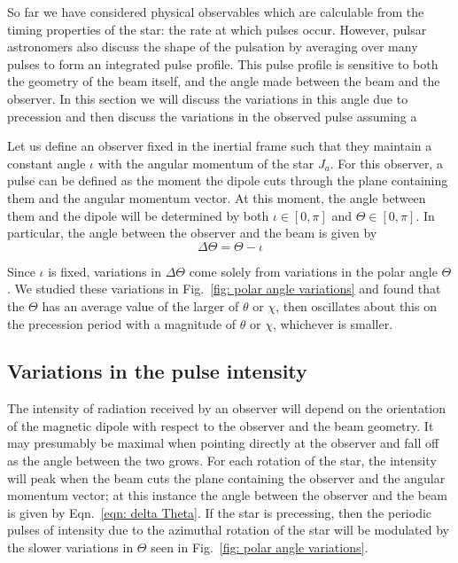 \documentclass[../full_thesis/full_thesis.tex]{subfiles}
\begin{document}
So far we have considered physical observables which are calculable from the
timing properties of the star: the rate at which pulses occur. However, pulsar
astronomers also discuss the shape of the pulsation by averaging over many
pulses to form an integrated pulse profile. This pulse profile is sensitive to
both the geometry of the beam itself, and the angle made between the beam and
the observer.  In this section we will discuss the variations in this angle due
to precession and then discuss the variations in the observed pulse assuming a

Let us define an observer fixed in the inertial frame such that they
maintain a constant angle $\iota$ with the angular momentum of the star $J_a$.
For this observer, a pulse can be defined as the moment the dipole cuts through
the plane containing them and the angular momentum vector. At this moment, the
angle between them and the dipole will be determined by both $\iota \in [0, \pi]$ and
$\Theta \in [0, \pi]$. In particular, the angle between the observer and the beam
is given by
\begin{equation}
\Delta\Theta = \Theta - \iota
\label{eqn: delta Theta}
\end{equation}

Since $\iota$ is fixed, variations in $\Delta\Theta$ come solely from variations
in the polar angle $\Theta$. We studied these variations in Fig.~\ref{fig:
polar angle variations} and found that the $\Theta$ has an average value of the
larger of $\theta$ or $\chi$, then oscillates about this on the precession period
with a magnitude of $\theta$ or $\chi$, whichever is smaller.

\subsection{Variations in the pulse intensity}

The intensity of radiation received by an observer will depend on the
orientation of the magnetic dipole with respect to the observer and the beam
geometry. It may presumably be maximal when pointing directly at the observer
and fall off as the angle between the two grows. For each rotation of the star,
the intensity will peak when the beam cuts the plane containing the observer
and the angular momentum vector; at this instance the angle between the
observer and the beam is given by Eqn.~\eqref{eqn: delta Theta}. If the star is
precessing, then the periodic pulses of intensity due to the azimuthal rotation
of the star will be modulated by the slower variations in $\Theta$ seen in
Fig.~\ref{fig: polar angle variations}.
\end{document}
